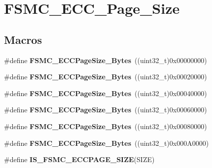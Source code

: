 \hypertarget{group___f_s_m_c___e_c_c___page___size}{\section{F\-S\-M\-C\-\_\-\-E\-C\-C\-\_\-\-Page\-\_\-\-Size}
\label{group___f_s_m_c___e_c_c___page___size}
}
\subsection*{Macros}
\begin{DoxyCompactItemize}
\item 
\hypertarget{group___f_s_m_c___e_c_c___page___size_gaaa1661267b44e6728fa64aca79de54b3}{\#define {\bfseries F\-S\-M\-C\-\_\-\-E\-C\-C\-Page\-Size\-\_\-Bytes}~((uint32\-\_\-t)0x00000000)}\label{group___f_s_m_c___e_c_c___page___size_gaaa1661267b44e6728fa64aca79de54b3}

\item 
\hypertarget{group___f_s_m_c___e_c_c___page___size_gacb4da17c28dde89e38ff4ed40497f6b5}{\#define {\bfseries F\-S\-M\-C\-\_\-\-E\-C\-C\-Page\-Size\-\_\-Bytes}~((uint32\-\_\-t)0x00020000)}\label{group___f_s_m_c___e_c_c___page___size_gacb4da17c28dde89e38ff4ed40497f6b5}

\item 
\hypertarget{group___f_s_m_c___e_c_c___page___size_ga8137931c96b63ec7e6f80a8c7391433f}{\#define {\bfseries F\-S\-M\-C\-\_\-\-E\-C\-C\-Page\-Size\-\_\-Bytes}~((uint32\-\_\-t)0x00040000)}\label{group___f_s_m_c___e_c_c___page___size_ga8137931c96b63ec7e6f80a8c7391433f}

\item 
\hypertarget{group___f_s_m_c___e_c_c___page___size_gab8f3ae95becd59e71a976b97ded904b8}{\#define {\bfseries F\-S\-M\-C\-\_\-\-E\-C\-C\-Page\-Size\-\_\-Bytes}~((uint32\-\_\-t)0x00060000)}\label{group___f_s_m_c___e_c_c___page___size_gab8f3ae95becd59e71a976b97ded904b8}

\item 
\hypertarget{group___f_s_m_c___e_c_c___page___size_gaec2e9e434685a1756bd171699248f65a}{\#define {\bfseries F\-S\-M\-C\-\_\-\-E\-C\-C\-Page\-Size\-\_\-Bytes}~((uint32\-\_\-t)0x00080000)}\label{group___f_s_m_c___e_c_c___page___size_gaec2e9e434685a1756bd171699248f65a}

\item 
\hypertarget{group___f_s_m_c___e_c_c___page___size_gab6877a99ddf02e7aa95cf04896ce731d}{\#define {\bfseries F\-S\-M\-C\-\_\-\-E\-C\-C\-Page\-Size\-\_\-Bytes}~((uint32\-\_\-t)0x000\-A0000)}\label{group___f_s_m_c___e_c_c___page___size_gab6877a99ddf02e7aa95cf04896ce731d}

\item 
\#define {\bfseries I\-S\-\_\-\-F\-S\-M\-C\-\_\-\-E\-C\-C\-P\-A\-G\-E\-\_\-\-S\-I\-Z\-E}(S\-I\-Z\-E)
\end{DoxyCompactItemize}


